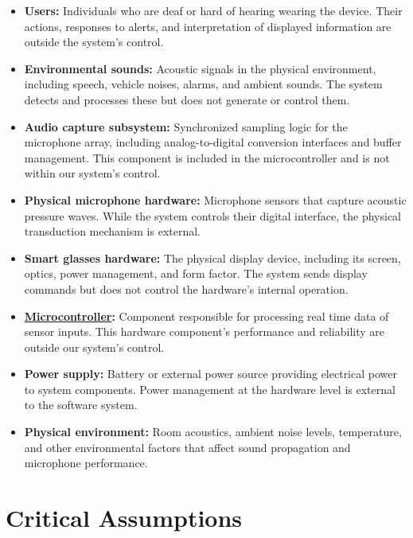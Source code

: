 \documentclass{article}
\begin{document}
\begin{itemize}
\item \textbf{Users:} Individuals who are deaf or hard of hearing wearing
the device. Their actions, responses to alerts, and interpretation of
displayed information are outside the system's control.

\item \textbf{Environmental sounds:} Acoustic signals in the physical
environment, including speech, vehicle noises, alarms, and ambient sounds.
The system detects and processes these but does not generate or control
them.

\item \textbf{Audio capture subsystem:} Synchronized sampling logic for the
microphone array, including analog-to-digital conversion interfaces and
buffer management. This component is included in the microcontroller and is not
within our system's control.

\item \textbf{Physical microphone hardware:} Microphone sensors that capture
acoustic pressure waves. While the system controls their digital interface,
the physical transduction mechanism is external.

\item \textbf{Smart glasses hardware:} The physical display device,
including its screen, optics, power management, and form factor. The system
sends display commands but does not control the hardware's internal
operation.

\item \textbf{\href{def:microcontroller}{Microcontroller}:}
\label{comp:microcontroller} Component responsible for processing real time
data of sensor inputs. This hardware component's performance and reliability
are outside our system's control.

\item \textbf{Power supply:} Battery or external power source providing
electrical power to system components. Power management at the hardware
level is external to the software system.

\item \textbf{Physical environment:} Room acoustics, ambient noise levels,
temperature, and other environmental factors that affect sound propagation
and microphone performance.
\end{itemize}



\section{Critical Assumptions}
\end{document}
